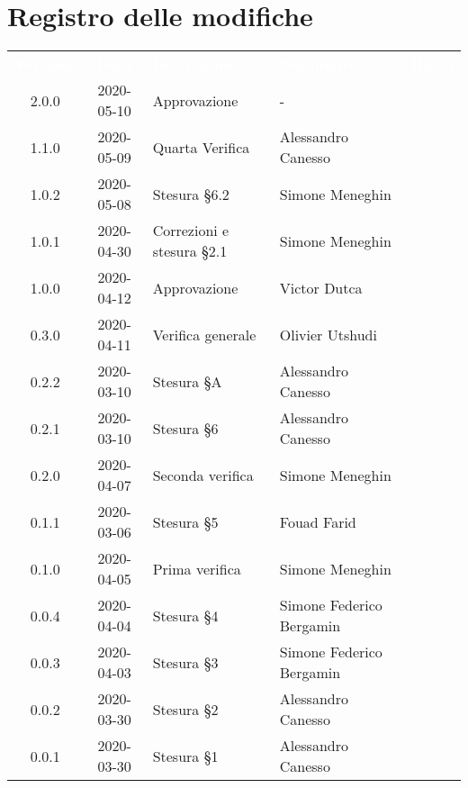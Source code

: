 \section*{Registro delle modifiche}
{
	\centering
	\begin{longtable}{ c c  C{4cm}  C{4cm}  C{3cm} }
		\textcolor{white}{\textbf{Versione}} & \textcolor{white}{\textbf{Data}} & \textcolor{white}{\textbf{Descrizione}} & \textcolor{white}{\textbf{Nominativo}} & \textcolor{white}{\textbf{Ruolo}}\\		
		2.0.0 & 2020-05-10 & Approvazione & - &\RdP{} \\
		1.1.0 & 2020-05-09 & Quarta Verifica & Alessandro Canesso &\ver{} \\
		1.0.2 & 2020-05-08 & Stesura \S 6.2 & Simone Meneghin &\adm{} \\
		1.0.1 & 2020-04-30 & Correzioni e stesura \S 2.1 & Simone Meneghin &\Res{} \\
		1.0.0 & 2020-04-12 & Approvazione & Victor Dutca &\RdP{} \\
		0.3.0 & 2020-04-11 & Verifica generale & Olivier Utshudi &\ver{} \\
		0.2.2 & 2020-03-10 & Stesura \S A & Alessandro Canesso &\Res{} \\
		0.2.1 & 2020-03-10 & Stesura \S 6 & Alessandro Canesso &\Res{} \\
		0.2.0 & 2020-04-07 & Seconda verifica & Simone Meneghin &\ver{} \\
		0.1.1 & 2020-03-06 & Stesura \S 5  & Fouad Farid &\Res{} \\
		0.1.0 & 2020-04-05 & Prima verifica & Simone Meneghin &\ver{} \\
		0.0.4 & 2020-04-04 & Stesura \S 4  & Simone Federico Bergamin &\adm{}\\	
		0.0.3 & 2020-04-03 & Stesura \S 3  & Simone Federico Bergamin &\adm{}\\	
		0.0.2 & 2020-03-30 & Stesura \S 2  & Alessandro Canesso &\Res{}\\	
		0.0.1 & 2020-03-30 & Stesura \S 1  & Alessandro Canesso &\Res{}\\		
	\end{longtable}
} 
